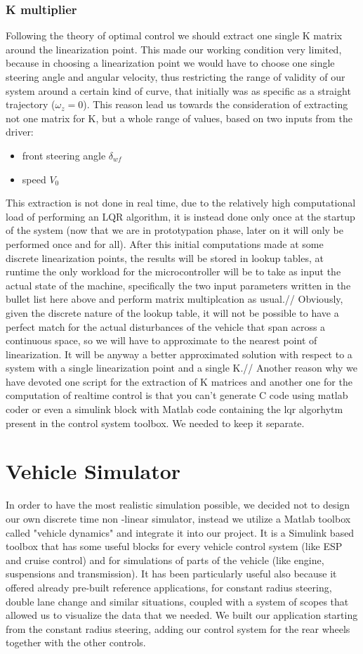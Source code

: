\documentclass[a4paper,12pt,titlepage]{report}
\begin{document}
	\subsection{K multiplier}
		Following the theory of optimal control we should extract one single K matrix around the linearization point. This made our working condition very limited, because in choosing a linearization point we would have to choose one single steering angle and angular velocity, thus restricting the range of validity of our system around a certain kind of curve, that initially was as specific as a straight trajectory ($\omega_{z}=0$).
		This reason lead us towards the consideration of extracting not one matrix for K, but a whole range of values, based on two inputs from the driver:
\begin{itemize}
	\item front steering angle $\delta_{wf}$
	\item speed $V_0$
\end{itemize}	
		This extraction is not done in real time, due to the relatively high computational load of performing an LQR algorithm, it is instead done only once at the startup of the system (now that we are in prototypation phase, later on it will only be performed once and for all). After this initial computations made at some discrete linearization points, the results will be stored in lookup tables, at runtime the only workload for the microcontroller will be to take as input the actual state of the machine, specifically the two input parameters written in the bullet list here above and perform matrix multiplcation as usual.//
		Obviously, given the discrete nature of the lookup table, it will not be possible to have a perfect match for the actual disturbances of the vehicle that span across a continuous space, so we will have to approximate to the nearest point of linearization. It will be anyway a better approximated solution with respect to a system with a single linearization point and a single K.//
		Another reason why we have devoted one script for the extraction of K matrices and another one for the computation of realtime control is that you can't generate C code using matlab coder or even a simulink block with Matlab code containing the lqr algorhytm present in the control system toolbox. We needed to keep it separate.
\chapter{Vehicle Simulator}
	In order to have the most realistic simulation possible, we decided not to design our own discrete time non -linear simulator, instead we utilize a Matlab toolbox called "vehicle dynamics" and integrate it into our project. It is a Simulink based toolbox that has some useful blocks for every vehicle control system (like ESP and cruise control) and for simulations of parts of the vehicle (like engine, suspensions and transmission). 
	It has been particularly useful also because it offered already pre-built reference applications, for constant radius steering, double lane change and similar situations, coupled with a system of scopes that allowed us to visualize the data that we needed. We built our application starting from the constant radius steering, adding our control system for the rear wheels together with the other controls.
\end{document}
